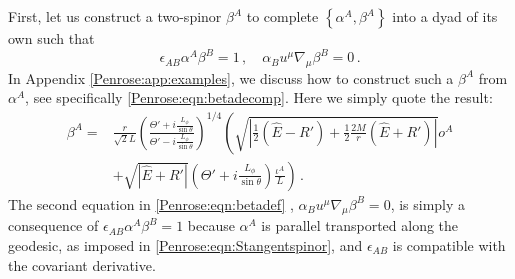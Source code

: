 First, let us construct a two-spinor $\beta^A$ to complete $\left\lbrace \alpha^A, \beta^A \right\rbrace$ into a dyad of its own such that 
\begin{equation}\label{Penrose:eqn:betadef}
\epsilon_{AB} \alpha^A \beta^B = 1 \, , \quad \alpha_B u^{\mu}\nabla_{\mu}\beta^B = 0 \, . 
\end{equation}
In Appendix \ref{Penrose:app:examples}, we discuss how to construct such a $\beta^A$ from $\alpha^A$, see specifically \eqref{Penrose:eqn:betadecomp}. Here we simply quote the result:
\begin{equation}\label{Penrose:eqn:beta}
\begin{aligned}
\beta^A = & \frac{r}{\sqrt{2} L}\left(\frac{\Theta'+i \frac{L_{\phi}}{\sin{\theta}}}{\Theta'-i \frac{L_{\phi}}{\sin{\theta}}}\right)^{1/4} \left(\sqrt{\left|\frac{1}{2}\left(\hat{E} - R'\right)+ \frac{1}{2}\frac{2M}{r} \left(\hat{E} + R'\right)\right|}o^A \right. \\ &+ \left. \sqrt{\left|\hat{E} + R'\right|} \left(\Theta'+i \frac{L_{\phi}}{\sin{\theta}}\right)\frac{\iota^A}{L} \right)\, .
\end{aligned}
\end{equation}
The second equation in \eqref{Penrose:eqn:betadef} , $\alpha_B u^{\mu}\nabla_{\mu}\beta^B = 0$, is simply a consequence of $\epsilon_{AB} \alpha^A \beta^B = 1$ because $\alpha^A$ is parallel transported along the geodesic, as imposed in \eqref{Penrose:eqn:Stangentspinor}, and $\epsilon_{AB}$ is compatible with the covariant derivative. 


